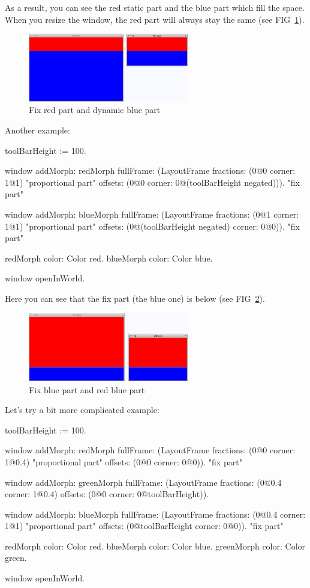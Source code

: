 \documentclass[a4paper,10pt,twoside]{book}
\begin{document}
As a result, you can see the red static part and the blue part which fill the space. When you resize the window, the red part will always stay the same (see FIG~\ref{fig:layoutFrame}).

\begin{figure}[ht]\centering
	\includegraphics[width=7cm]{LayoutFrame}
	\caption{Fix red part and dynamic blue part}
	\label{fig:layoutFrame}
\end{figure}

Another example:
\begin{code}{}
toolBarHeight := 100.

window
	addMorph: redMorph
	fullFrame: (LayoutFrame
				fractions: (0@0 corner: 1@1) "proportional part"
				offsets: (0@0 corner: 0@(toolBarHeight negated))). "fix part"

window
	addMorph: blueMorph
	fullFrame: (LayoutFrame
				fractions: (0@1 corner: 1@1) "proportional part"
				offsets: (0@(toolBarHeight negated) corner: 0@0)). "fix part"

redMorph color: Color red.
blueMorph color: Color blue.
	
window openInWorld.
\end{code}

Here you can see that the fix part (the blue one) is below (see FIG~\ref{fig:layoutFrame2}).

\begin{figure}[ht]\centering
	\includegraphics[width=7cm]{LayoutFrame2}
	\caption{Fix blue part and red blue part}
	\label{fig:layoutFrame2}
\end{figure}

Let's try a bit more complicated example:
\begin{code}{}
toolBarHeight := 100.

window
	addMorph: redMorph
	fullFrame: (LayoutFrame
				fractions: (0@0 corner: 1@0.4) "proportional part"
				offsets: (0@0 corner: 0@0)). "fix part"
				
window
	addMorph: greenMorph
	fullFrame: (LayoutFrame
				fractions: (0@0.4 corner: 1@0.4)
				offsets: (0@0 corner: 0@toolBarHeight)).				

window
	addMorph: blueMorph
	fullFrame: (LayoutFrame
				fractions: (0@0.4 corner: 1@1) "proportional part"
				offsets: (0@toolBarHeight corner: 0@0)). "fix part"

redMorph color: Color red.
blueMorph color: Color blue.
greenMorph color: Color green.
	
window openInWorld.
\end{code}
\end{document}
